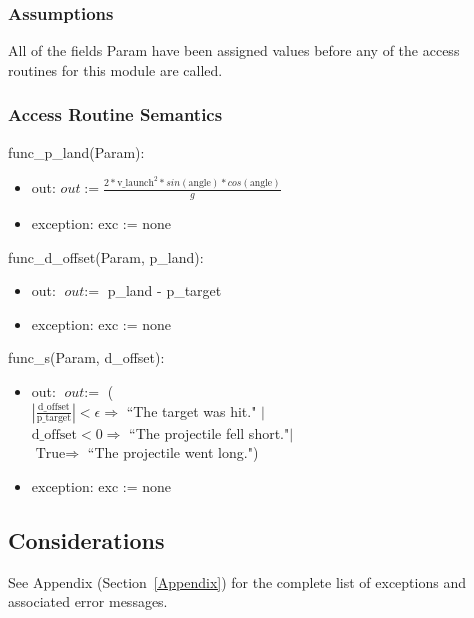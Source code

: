 \documentclass[12pt, titlepage]{article}
\begin{document}
\subsubsection{Assumptions}

All of the fields Param have been assigned values before any of the access
 routines for this module are called.

\subsubsection{Access Routine Semantics}

func\_p\_land(Param):
 \begin{itemize}
 \item out: $\textit{out} := \frac{2 * \text{v\_launch}^2 * sin(\text{angle}) * cos(\text{angle})}{g}$
 \item exception: exc := none
 \end{itemize}
 
func\_d\_offset(Param, p\_land):
 \begin{itemize}
 \item out: $\textit{out} := $ p\_land - p\_target
 \item exception: exc := none
 \end{itemize}
 
func\_s(Param, d\_offset):
 \begin{itemize}
 \item out: $\textit{out} := $ ( \\
$|\frac{\text{d\_offset}}{\text{p\_target}}| < \epsilon \Rightarrow$ ``The target was hit." $|$\\
$\text{d\_offset} < 0 \Rightarrow$ ``The projectile fell short."$|$\\
$\text{True} \Rightarrow$ ``The projectile went long.")
 \item exception: exc := none
 \end{itemize}

\subsection{Considerations}

See Appendix (Section~\ref{Appendix}) for the complete list of exceptions and
 associated error messages.
\end{document}
